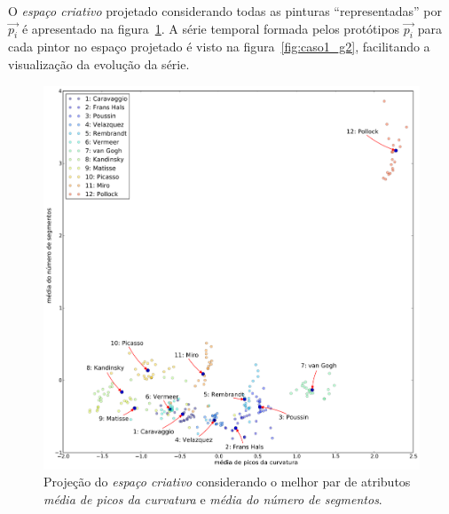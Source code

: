 O \textit{espaço criativo} projetado considerando todas as pinturas
``representadas'' por $\vec{p_i}$ é apresentado na
figura~\ref{fig:caso1_g1}. A série temporal formada pelos protótipos
$\vec{p_i}$ para cada pintor no espaço projetado é visto na
figura~\ref{fig:caso1_g2}, facilitando a visualização da evolução da
série. 

\begin{figure}[h!]
\begin{center}
           \caption{Projeção do \textit{espaço criativo} considerando o
        melhor par de atributos \emph{média de picos da curvatura} e
        \emph{média do número de segmentos}.}
        \label{fig:caso1_g1}
        \includegraphics[scale=.5]{figs/caso1_g1}
        \fonteminha
\end{center}
\end{figure}

